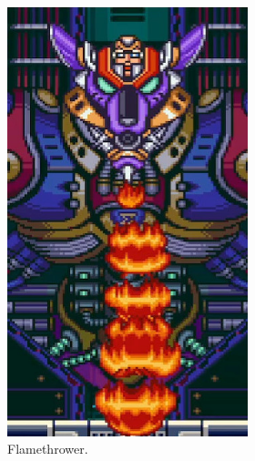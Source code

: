 \begin{figure}[htp]
\begin{figure}[htp]
\begin{subfigure}{0.85\linewidth}
	\end{subfigure}
	\begin{subfigure}[t]{0.24\linewidth}
		\centering
		\includegraphics[width=\linewidth]{figures/X1/Sigma_stages/WolfSigma_fire.jpg}
		\caption{Flamethrower.}
	\end{subfigure}
	\begin{subfigure}[t]{0.3\linewidth}
		\centering

\end{subfigure}
\end{figure}
\end{figure}

